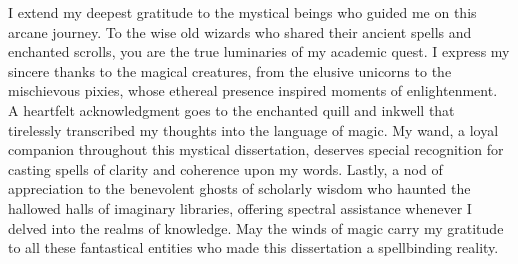 I extend my deepest gratitude to the mystical beings who guided me on this arcane journey. To the wise old wizards who shared their ancient spells and enchanted scrolls, you are the true luminaries of my academic quest. I express my sincere thanks to the magical creatures, from the elusive unicorns to the mischievous pixies, whose ethereal presence inspired moments of enlightenment. A heartfelt acknowledgment goes to the enchanted quill and inkwell that tirelessly transcribed my thoughts into the language of magic. My wand, a loyal companion throughout this mystical dissertation, deserves special recognition for casting spells of clarity and coherence upon my words. Lastly, a nod of appreciation to the benevolent ghosts of scholarly wisdom who haunted the hallowed halls of imaginary libraries, offering spectral assistance whenever I delved into the realms of knowledge. May the winds of magic carry my gratitude to all these fantastical entities who made this dissertation a spellbinding reality.